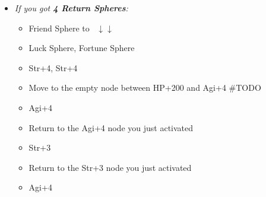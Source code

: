 \winnp
\lossvfill
\lossnp
\begin{spheregrid}
    \begin{itemize}
        \yunaf
        \begin{itemize}
            \item \textit{If you got \textbf{4 Return Spheres}:}
                \begin{itemize}
                    \item Friend Sphere to \lulu\ $\downarrow\downarrow$
                    \item Luck Sphere, Fortune Sphere
                    \item Str+4, Str+4
                    \item Move to the empty node between HP+200 and Agi+4 \#TODO
                    \item Agi+4
                    \item Return to the Agi+4 node you just activated
                    \item Str+3
                    \item Return to the Str+3 node you just activated
                    \item Agi+4
                \end{itemize}

\end{itemize}
\end{itemize}
\end{spheregrid}
